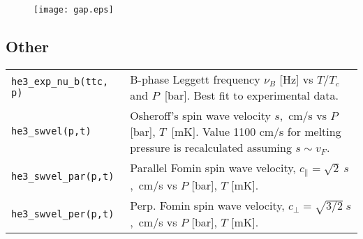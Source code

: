 \documentclass[a4paper]{article}
\begin{document}
\begin{figure}[h]
\texttt{[image: gap.eps]}
\end{figure}

\subsection*{Other}

\medskip
\begin{tabular}{lp{9cm}}
\tt he3\_exp\_nu\_b(ttc, p)     &B-phase Leggett frequency $\nu_B$ [Hz] vs
                                 $T/T_c$ and $P$~[bar].\newline
                                  Best fit to experimental data.\\
\tt he3\_swvel(p,t) & Osheroff's spin wave velocity $s$,~cm/s
                      vs $P$ [bar], $T$~[mK]. Value 1100 cm/s for
                      melting pressure is recalculated assuming $s\sim v_F$.\\
\tt he3\_swvel\_par(p,t) & Parallel Fomin spin wave velocity,\newline
                          $c_\parallel = \sqrt{2}\ s$,~cm/s vs $P$ [bar], $T$ [mK].\\
\tt he3\_swvel\_per(p,t) & Perp. Fomin spin wave velocity,\newline
                          $c_\perp = \sqrt{3/2}\ s$,~cm/s vs $P$ [bar], $T$ [mK].\\

\end{tabular}
\medskip

\end{document}
